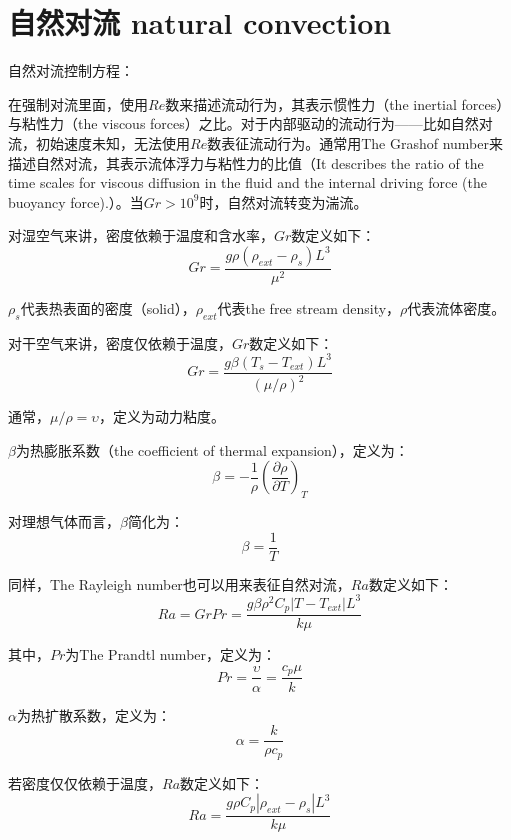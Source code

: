 \section{自然对流 natural convection}

自然对流控制方程：


在强制对流里面，使用$Re$数来描述流动行为，其表示惯性力（the inertial
forces）与粘性力（the viscous forces）之比。对于内部驱动的流动行为——比如自然对流，初始速度未知，无法使用$Re$数表征流动行为。通常用The Grashof number来描述自然对流，其表示流体浮力与粘性力的比值（It describes the ratio of the time scales for viscous diffusion in the fluid and the internal driving force (the buoyancy force).）。当$Gr>10^9$时，自然对流转变为湍流。

对湿空气来讲，密度依赖于温度和含水率，$Gr$数定义如下：
\begin{equation}
    Gr = \frac{g\rho (\rho_{ext} - \rho_s) L^3}{\mu^2}
\end{equation}

$\rho_s$代表热表面的密度（solid），$\rho_{ext}$代表the free stream density，$\rho$代表流体密度。

对干空气来讲，密度仅依赖于温度，$Gr$数定义如下：
\begin{equation}
    Gr = \frac{g\beta (T_s - T_{ext})L^3}{(\mu/\rho)^2}
\end{equation}

通常，$\mu/\rho=\upsilon$，定义为动力粘度。

$\beta$为热膨胀系数（the coefficient of thermal expansion），定义为：
\begin{equation}
    \beta = -\frac{1}{\rho} \left( \frac{\partial \rho}{\partial T} \right)_T
\end{equation}

对理想气体而言，$\beta$简化为：
\begin{equation}
    \beta = \frac{1}{T}
\end{equation}

同样，The Rayleigh number也可以用来表征自然对流，$Ra$数定义如下：
\begin{equation}
    Ra = GrPr =\frac{g\beta\rho^2 C_p |T-T_{ext}|L^3}{k\mu}
\end{equation}

其中，$Pr$为The Prandtl number，定义为：
\begin{equation}
    Pr = \frac{\upsilon}{\alpha} = \frac{c_p\mu}{k}
\end{equation}

$\alpha$为热扩散系数，定义为：
\begin{equation}
    \alpha = \frac{k}{\rho c_p}
\end{equation}


若密度仅仅依赖于温度，$Ra$数定义如下：
\begin{equation}
    Ra = \frac{g\rho C_p |\rho_{ext}-\rho_s|L^3}{k\mu}
\end{equation}
